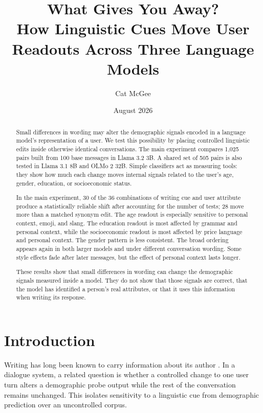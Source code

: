 \documentclass[11pt]{article}
\title{What Gives You Away?\\ \Large How Linguistic Cues Move User Readouts Across Three Language Models}
\author{Cat McGee}
\date{August 2026}
\begin{document}
\maketitle

\begin{abstract}
Small differences in wording may alter the demographic signals encoded in a
language model's representation of a user. We test this possibility by placing
controlled linguistic edits inside otherwise identical conversations. The
main experiment compares 1,025 pairs built from 100 base messages in Llama 3.2
3B. A shared set of 505 pairs is also tested in Llama 3.1 8B and OLMo 2 32B.
Simple classifiers act as measuring tools: they show how much each change moves
internal signals related to the user's age, gender, education, or socioeconomic
status.

In the main experiment, 30 of the 36 combinations of writing cue and user
attribute produce a statistically reliable shift after accounting for the
number of tests; 28 move more than a matched synonym edit. The age readout is
especially sensitive to personal context, emoji, and slang. The education
readout is most affected by grammar and personal context, while the
socioeconomic readout is most affected by price language and personal context.
The gender pattern is less consistent. The broad ordering appears again in both
larger models and under different conversation wording. Some style effects
fade after later messages, but the effect of personal context lasts longer.

These results show that small differences in wording can change the demographic
signals measured inside a model. They do not show that those signals are
correct, that the model has identified a person's real attributes, or that it
uses this information when writing its response.
\end{abstract}

\section{Introduction}

Writing has long been known to carry information about its author
\citep{stamatatos2009survey,schler2006blogs}. In a dialogue system, a related
question is whether a controlled change to one user turn alters a demographic
probe output while the rest of the conversation remains unchanged. This
isolates sensitivity to a linguistic cue from demographic prediction over an
uncontrolled corpus.
\end{document}
